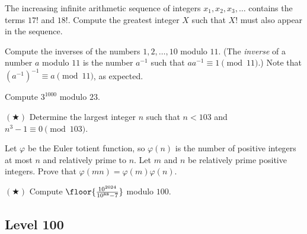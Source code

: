 \documentclass[11pt]{scrartcl}
\begin{document}
\begin{exercise}
	The increasing infinite arithmetic sequence of integers $x_1,x_2,x_3,\dots$ contains the terms $17!$ and $18!$. Compute the greatest integer $X$ such that $X!$ must also appear in the sequence. %
\end{exercise}

\begin{exercise}
	Compute the inverses of the numbers $1,2,\dots,10$ modulo $11$. (The \emph{inverse} of a number $a$ modulo $11$ is the number $a^{-1}$ such that $aa^{-1} \equiv 1 \pmod{11}$.) Note that $(a^{-1})^{-1} \equiv a \pmod{11}$, as expected.
\end{exercise}

\begin{exercise}
	Compute $3^{1000}$ modulo $23$. %
\end{exercise}

\begin{exercise}[Prize 2022/4] $(\bigstar)$
	Determine the largest integer $n$ such that $n < 103$ and $n^3 - 1 \equiv 0 \pmod{103}$. %
\end{exercise}

\begin{exercise}
	Let $\varphi$ be the Euler totient function, so $\varphi(n)$ is the number of positive integers at most $n$ and relatively prime to $n$. Let $m$ and $n$ be relatively prime positive integers. Prove that $\varphi(mn) = \varphi(m)\varphi(n)$.
\end{exercise}


\begin{exercise} $(\bigstar)$
	Compute $\floor{\frac{10^{2024}}{10^{88} - 7}}$ modulo $100$. %
\end{exercise}

\subsection{Level 100}\label{subsec:hard}
\end{document}
